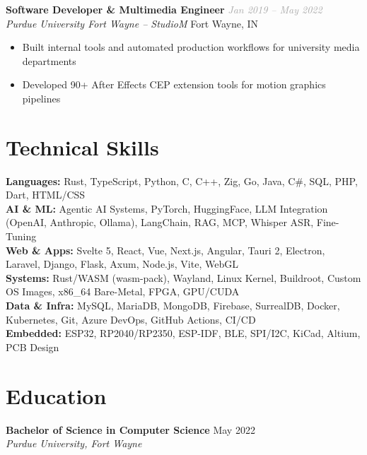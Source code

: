 \documentclass[10pt,letterpaper]{article}
\newcommand{\entry}[4]{%
    \noindent\textbf{#1} \hfill \textcolor{darkgray}{\textit{#2}} \\[-2pt]
    \textit{#3} \hfill \textcolor{medgray}{#4}\par
}
\newcommand{\skillcat}[2]{\textbf{#1:} #2}
\begin{document}
\vspace{2pt}
\entry{Software Developer \& Multimedia Engineer}{Jan 2019 -- May 2022}{Purdue University Fort Wayne -- StudioM}{Fort Wayne, IN}
\vspace{-2pt}
\begin{itemize}[leftmargin=12pt, itemsep=0pt, topsep=1pt, parsep=0pt]
    \small
    \item Built internal tools and automated production workflows for university media departments
    \item Developed 90+ After Effects CEP extension tools for motion graphics pipelines
\end{itemize}

\section{Technical Skills}
\vspace{-1pt}
{\small
\skillcat{Languages}{Rust, TypeScript, Python, C, C++, Zig, Go, Java, C\#, SQL, PHP, Dart, HTML/CSS}\\[2pt]
\skillcat{AI \& ML}{Agentic AI Systems, PyTorch, HuggingFace, LLM Integration (OpenAI, Anthropic, Ollama), LangChain, RAG, MCP, Whisper ASR, Fine-Tuning}\\[2pt]
\skillcat{Web \& Apps}{Svelte 5, React, Vue, Next.js, Angular, Tauri 2, Electron, Laravel, Django, Flask, Axum, Node.js, Vite, WebGL}\\[2pt]
\skillcat{Systems}{Rust/WASM (wasm-pack), Wayland, Linux Kernel, Buildroot, Custom OS Images, x86\_64 Bare-Metal, FPGA, GPU/CUDA}\\[2pt]
\skillcat{Data \& Infra}{MySQL, MariaDB, MongoDB, Firebase, SurrealDB, Docker, Kubernetes, Git, Azure DevOps, GitHub Actions, CI/CD}\\[2pt]
\skillcat{Embedded}{ESP32, RP2040/RP2350, ESP-IDF, BLE, SPI/I2C, KiCad, Altium, PCB Design}
}

\section{Education}
\vspace{1pt}
\textbf{Bachelor of Science in Computer Science} \hfill \textcolor{medgray}{May 2022}\\[-2pt]
{\small\textit{Purdue University, Fort Wayne}}

\end{document}
